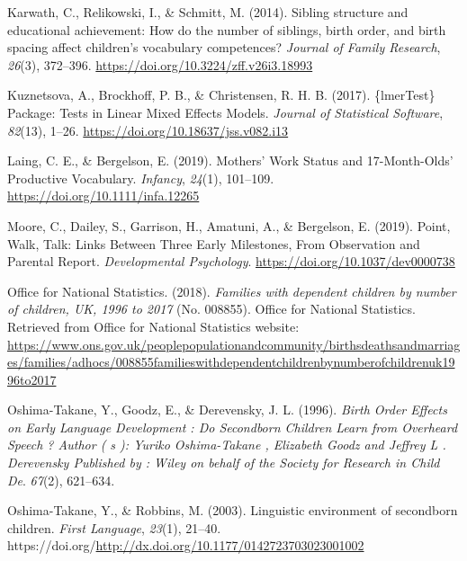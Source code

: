 \documentclass[
  man,floatsintext]{apa6}
\newlength{\cslhangindent}
\newlength{\cslentryspacingunit} %
\newenvironment{CSLReferences}[2] %
 {%
  \setlength{\parindent}{0pt}
  \ifodd #1
  \let\oldpar\par
  \def\par{\hangindent=\cslhangindent\oldpar}
  \fi
  \setlength{\parskip}{#2\cslentryspacingunit}
 }%
 {}
\begin{document}
\begin{CSLReferences}{1}{0}
\leavevmode{}%
Karwath, C., Relikowski, I., \& Schmitt, M. (2014). Sibling structure and educational achievement: How do the number of siblings, birth order, and birth spacing affect children's vocabulary competences? \emph{Journal of Family Research}, \emph{26}(3), 372--396. \url{https://doi.org/10.3224/zff.v26i3.18993}

\leavevmode{}%
Kuznetsova, A., Brockhoff, P. B., \& Christensen, R. H. B. (2017). \{{lmerTest}\} {Package}: {Tests} in {Linear} {Mixed} {Effects} {Models}. \emph{Journal of Statistical Software}, \emph{82}(13), 1--26. \url{https://doi.org/10.18637/jss.v082.i13}

\leavevmode{}%
Laing, C. E., \& Bergelson, E. (2019). Mothers' {Work} {Status} and 17-{Month}-{Olds}' {Productive} {Vocabulary}. \emph{Infancy}, \emph{24}(1), 101--109. \url{https://doi.org/10.1111/infa.12265}

\leavevmode{}%
Moore, C., Dailey, S., Garrison, H., Amatuni, A., \& Bergelson, E. (2019). Point, {Walk}, {Talk}: {Links} {Between} {Three} {Early} {Milestones}, {From} {Observation} and {Parental} {Report}. \emph{Developmental Psychology}. \url{https://doi.org/10.1037/dev0000738}

\leavevmode{}%
Office for National Statistics. (2018). \emph{Families with dependent children by number of children, {UK}, 1996 to 2017} (No. 008855). Office for National Statistics. Retrieved from Office for National Statistics website: \url{https://www.ons.gov.uk/peoplepopulationandcommunity/birthsdeathsandmarriages/families/adhocs/008855familieswithdependentchildrenbynumberofchildrenuk1996to2017}

\leavevmode{}%
Oshima-Takane, Y., Goodz, E., \& Derevensky, J. L. (1996). \emph{Birth {Order} {Effects} on {Early} {Language} {Development} : {Do} {Secondborn} {Children} {Learn} from {Overheard} {Speech} ? {Author} ( s ): {Yuriko} {Oshima}-{Takane} , {Elizabeth} {Goodz} and {Jeffrey} {L} . {Derevensky} {Published} by : {Wiley} on behalf of the {Society} for {Research} in {Child} {De}}. \emph{67}(2), 621--634.

\leavevmode{}%
Oshima-Takane, Y., \& Robbins, M. (2003). Linguistic environment of secondborn children. \emph{First Language}, \emph{23}(1), 21--40. https://doi.org/\url{http://dx.doi.org/10.1177/0142723703023001002}


\end{CSLReferences}
\end{document}
